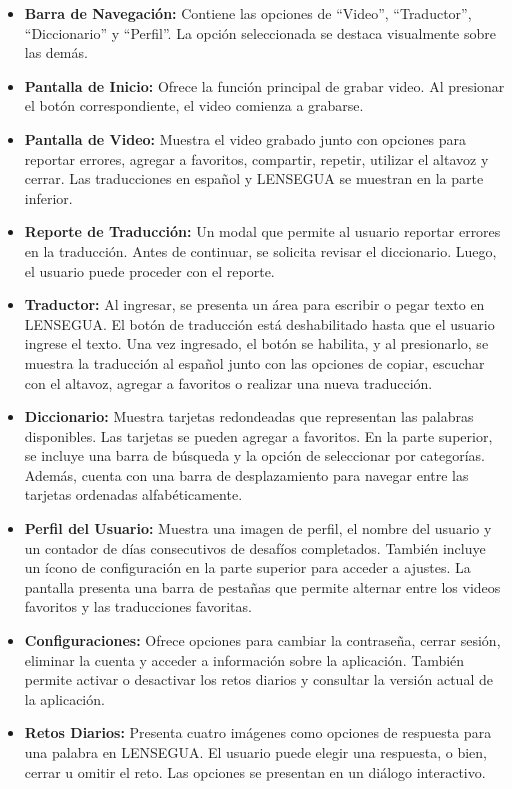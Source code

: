 \begin{itemize}
    \item \textbf{Barra de Navegación:} Contiene las opciones de ``Video'', ``Traductor'', ``Diccionario'' y ``Perfil''. La opción seleccionada se destaca visualmente sobre las demás.
    
    \item \textbf{Pantalla de Inicio:} Ofrece la función principal de grabar video. Al presionar el botón correspondiente, el video comienza a grabarse.
    
    \item \textbf{Pantalla de Video:} Muestra el video grabado junto con opciones para reportar errores, agregar a favoritos, compartir, repetir, utilizar el altavoz y cerrar. Las traducciones en español y LENSEGUA se muestran en la parte inferior.
    
    \item \textbf{Reporte de Traducción:} Un modal que permite al usuario reportar errores en la traducción. Antes de continuar, se solicita revisar el diccionario. Luego, el usuario puede proceder con el reporte.
    
    \item \textbf{Traductor:} Al ingresar, se presenta un área para escribir o pegar texto en LENSEGUA. El botón de traducción está deshabilitado hasta que el usuario ingrese el texto. Una vez ingresado, el botón se habilita, y al presionarlo, se muestra la traducción al español junto con las opciones de copiar, escuchar con el altavoz, agregar a favoritos o realizar una nueva traducción.
    
    \item \textbf{Diccionario:} Muestra tarjetas redondeadas que representan las palabras disponibles. Las tarjetas se pueden agregar a favoritos. En la parte superior, se incluye una barra de búsqueda y la opción de seleccionar por categorías. Además, cuenta con una barra de desplazamiento para navegar entre las tarjetas ordenadas alfabéticamente.
    
    \item \textbf{Perfil del Usuario:} Muestra una imagen de perfil, el nombre del usuario y un contador de días consecutivos de desafíos completados. También incluye un ícono de configuración en la parte superior para acceder a ajustes. La pantalla presenta una barra de pestañas que permite alternar entre los videos favoritos y las traducciones favoritas.
    
    \item \textbf{Configuraciones:} Ofrece opciones para cambiar la contraseña, cerrar sesión, eliminar la cuenta y acceder a información sobre la aplicación. También permite activar o desactivar los retos diarios y consultar la versión actual de la aplicación.
    
    \item \textbf{Retos Diarios:} Presenta cuatro imágenes como opciones de respuesta para una palabra en LENSEGUA. El usuario puede elegir una respuesta, o bien, cerrar u omitir el reto. Las opciones se presentan en un diálogo interactivo.
\end{itemize}


